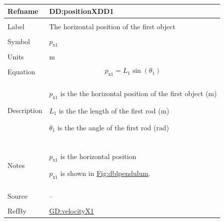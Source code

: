\documentclass[12pt]{article}
\begin{document}
\vspace{\baselineskip}
\noindent
\begin{minipage}{\textwidth}
\begin{tabular}{>{\raggedright}p{}>{\raggedright\arraybackslash}p{}}
\toprule \textbf{Refname} & \textbf{DD:positionXDD1}
\label{DD:positionXDD1}
\\ \midrule \\
Label & The horizontal position of the first object
        
\\ \midrule \\
Symbol & ${p_{\text{x}1}}$
         
\\ \midrule \\
Units & ${\text{m}}$
        
\\ \midrule \\
Equation & \begin{displaymath}
           {p_{\text{x}1}}={L_{1}} \sin\left({θ_{1}}\right)
           \end{displaymath}
\\ \midrule \\
Description & \begin{symbDescription}
              \item{${p_{\text{x}1}}$ is the the horizontal position of the first object (${\text{m}}$)}
              \item{${L_{1}}$ is the the length of the first rod (${\text{m}}$)}
              \item{${θ_{1}}$ is the the angle of the first rod (${\text{rad}}$)}
              \end{symbDescription}
\\ \midrule \\
Notes & ${p_{\text{x}1}}$ is the horizontal position
        
        ${p_{\text{x}1}}$ is shown in \hyperref[Figure:dblpendulum]{Fig:dblpendulum}.
        
\\ \midrule \\
Source & --
         
\\ \midrule \\
RefBy & \hyperref[GD:velocityX1]{GD:velocityX1}
        
\\ \bottomrule
\end{tabular}
\end{minipage}
\end{document}
